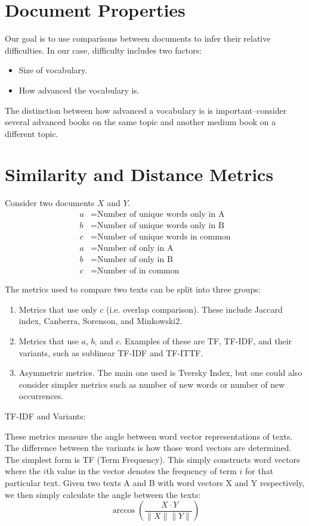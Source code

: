 \documentclass[11pt]{paper}
\begin{document}
\section{Document Properties}

Our goal is to use comparisons between documents to infer their relative difficulties. In our case, difficulty includes two factors:
\begin{itemize}
  \item Size of vocabulary.
  \item How advanced the vocabulary is.
\end{itemize}
The distinction between how advanced a vocabulary is is important--consider several advanced books on the same topic and another medium book on a different topic. 

\section{Similarity and Distance Metrics}

Consider two documents $X$ and $Y$. 
\begin{align*}
  a &= \text{Number of unique words only in A} \\
  b &= \text{Number of unique words only in B} \\
  c &= \text{Number of unique words in common} \\
  a &= \text{Number of only in A} \\
  b &= \text{Number of only in B} \\
  c &= \text{Number of in common}
\end{align*}

The metrics used to compare two texts can be split into three groups:
\begin{enumerate}
	\item Metrics that use only $c$ (i.e. overlap comparison). These include Jaccard index, Canberra, Sorenson, and Minkowski2.
	\item Metrics that use $a$, $b$, and $c$. Examples of these are TF, TF-IDF, and their variants, such as sublinear TF-IDF and TF-ITTF.
	\item Asymmetric metrics. The main one used is Tversky Index, but one could also consider simpler metrics such as number of new words or number of new occurrences.
\end{enumerate}

TF-IDF and Variants:

These metrics measure the angle between word vector representations of texts. The difference between the variants is how those word vectors are determined. The simplest form is TF (Term Frequency). This simply constructs word vectors where the $i$th value in the vector denotes the frequency of term $i$ for that particular text. Given two texts A and B with word vectors X and Y respectively, we then simply calculate the angle between the texts:
$$\arccos \left( \frac{\ X \cdot Y }{ \lVert X \rVert \lVert Y \rVert} \right)$$
\end{document}
